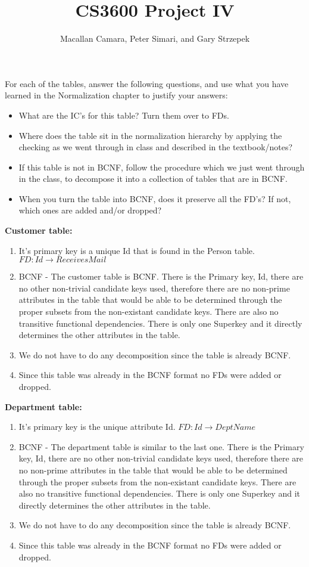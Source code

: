 \documentclass{article}
\title{CS3600 Project IV}
\author{Macallan Camara, Peter Simari, and Gary Strzepek}
\begin{document}
  \maketitle
  \par For each of the tables, answer the following questions, and use what you
  have learned in the Normalization chapter to justify your answers:
  \begin{itemize}
  	\item What are the IC's for this table? Turn them over to FDs.
  	\item Where does the table sit in the normalization hierarchy by applying the
  	checking as we went through in class and described in the textbook/notes?
  	\item If this table is not in BCNF, follow the procedure which we just went
  	through in the class, to decompose it into a collection of tables that are in
  	BCNF.
  	\item When you turn the table into BCNF, does it preserve all the FD's? If
  	not, which ones are added and/or dropped?
  \end{itemize}
  \par\textbf{Customer table:}
  \begin{enumerate}[label=\roman*]
  	\item It's primary key is a unique Id that is found in the Person table. \newline
    $FD: Id \rightarrow ReceivesMail$
  	\item BCNF - The customer table is BCNF. There is the Primary key, Id, there are no other non-trivial candidate keys used, therefore there are no non-prime attributes in the table that would be able to be determined through the proper subsets from the non-existant candidate keys. There are also no transitive functional dependencies. There is only one Superkey and it directly determines the other attributes in the table.
  	\item We do not have to do any decomposition since the table is already BCNF.
  	\item Since this table was already in the BCNF format no FDs were added or dropped.
  \end{enumerate}
  \par\textbf{Department table:}
  \begin{enumerate}[label=\roman*]
  	\item It's primary key is the unique attribute Id. \newline
    $FD: Id \rightarrow DeptName$
  	\item BCNF - The department table is similar to the last one. There is the Primary key, Id, there are no other non-trivial candidate keys used, therefore there are no non-prime attributes in the table that would be able to be determined through the proper subsets from the non-existant candidate keys. There are also no transitive functional dependencies. There is only one Superkey and it directly determines the other attributes in the table.
  	\item We do not have to do any decomposition since the table is already BCNF.
  	\item Since this table was already in the BCNF format no FDs were added or dropped.
  \end{enumerate}
\end{document}
